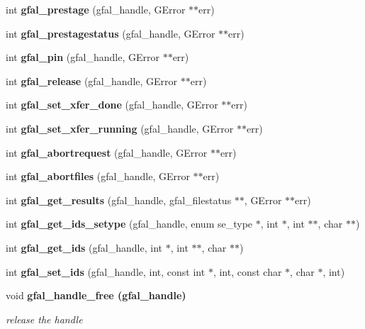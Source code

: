 \begin{CompactItemize}
\item 
int \textbf{gfal\_\-prestage} (gfal\_\-handle, GError $\ast$$\ast$err)\label{group__srm__group_g7203e8c1902d92bd349baa0bb1120868}

\item 
int \textbf{gfal\_\-prestagestatus} (gfal\_\-handle, GError $\ast$$\ast$err)\label{group__srm__group_g6e1fad549e7d87ccba3f5aad262c4bb7}

\item 
int \textbf{gfal\_\-pin} (gfal\_\-handle, GError $\ast$$\ast$err)\label{group__srm__group_g2071e5e174ad0e186b2e2ed221ff254a}

\item 
int \textbf{gfal\_\-release} (gfal\_\-handle, GError $\ast$$\ast$err)\label{group__srm__group_g1814902f6764e9895555b337ebe072cf}

\item 
int \textbf{gfal\_\-set\_\-xfer\_\-done} (gfal\_\-handle, GError $\ast$$\ast$err)\label{group__srm__group_g53578369e607b8ee44ca5acdd1723e46}

\item 
int \textbf{gfal\_\-set\_\-xfer\_\-running} (gfal\_\-handle, GError $\ast$$\ast$err)\label{group__srm__group_g28565cf7c05f3dcfe82f3d7f716ae39a}

\item 
int \textbf{gfal\_\-abortrequest} (gfal\_\-handle, GError $\ast$$\ast$err)\label{group__srm__group_g31c2fcfa5efdb1a7c93ffaaa457d9357}

\item 
int \textbf{gfal\_\-abortfiles} (gfal\_\-handle, GError $\ast$$\ast$err)\label{group__srm__group_g009a98403584e32536a8d7ebe66284fd}

\item 
int \textbf{gfal\_\-get\_\-results} (gfal\_\-handle, gfal\_\-filestatus $\ast$$\ast$, GError $\ast$$\ast$err)\label{group__srm__group_g3b4725f553de6720a80036d28a4fb28d}

\item 
int \textbf{gfal\_\-get\_\-ids\_\-setype} (gfal\_\-handle, enum se\_\-type $\ast$, int $\ast$, int $\ast$$\ast$, char $\ast$$\ast$)\label{group__srm__group_g2bed7d372296a8d43282cea69ccb663e}

\item 
int \textbf{gfal\_\-get\_\-ids} (gfal\_\-handle, int $\ast$, int $\ast$$\ast$, char $\ast$$\ast$)\label{group__srm__group_g72418d9d0374b8beca6fca284a8e5db2}

\item 
int \textbf{gfal\_\-set\_\-ids} (gfal\_\-handle, int, const int $\ast$, int, const char $\ast$, char $\ast$, int)\label{group__srm__group_g5da8c01443270bf26cb6f60fe1457c53}

\item 
void \bf{gfal\_\-handle\_\-free} (gfal\_\-handle)\label{group__srm__group_ga21bc6b4163400d28590637b474a1b05}

\begin{CompactList}\small\item\em release the handle \item\end{CompactList}\end{CompactItemize}


